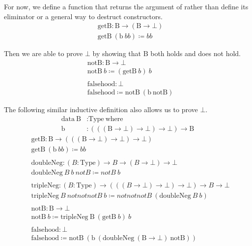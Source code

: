 \documentclass{report}
\newcommand{\const}[1]{\text{#1}}
\newcommand{\data}{\const{data}}
\newcommand{\Type}{\const{Type}}
\newcommand{\where}{\const{where}}
\begin{document}
For now, we define a function that returns the argument of \const{b} rather than define its eliminator or a general way to destruct constructors.
%
\begin{align*}
    &\const{getB}: \const{B} \to (\const{B} \to \bot) \\
    &\const{getB} ~ (\const{b} ~ bb) \coloneqq bb
\end{align*}

Then we are able to prove $\bot$ by showing that $\const{B}$ both holds and does not hold.
%
\begin{align*}
    &\const{notB}: \const{B} \to \bot \\
    &\const{notB} ~ b \coloneqq (\const{getB} ~ b) ~ b \\
    \\
    &\const{falsehood}: \bot \\
    &\const{falsehood} \coloneqq \const{notB} ~ (\const{b} ~ \const{notB})
\end{align*}

The following similar inductive definition also allows us to prove $\bot$.
%
\begin{align*}
    \data ~ \const{B} &: \Type ~ \where \\
    \const{b} &: (((\const{B} \to \bot) \to \bot) \to \bot) \to \const{B}
\end{align*}
\begin{align*}
    &\const{getB}: \const{B} \to (((\const{B} \to \bot) \to \bot) \to \bot) \\
    &\const{getB} ~ (\const{b} ~ bb) \coloneqq bb \\
    \\
    &\const{doubleNeg}: (B: \Type) \to B \to (B \to \bot) \to \bot \\
    &\const{doubleNeg} ~ B ~ b ~ notB \coloneqq notB ~ b \\
    \\
    &\const{tripleNeg}: (B: \Type) \to (((B \to \bot) \to \bot) \to \bot) \to B \to \bot \\
    &\const{tripleNeg} ~ B ~ notnotnotB ~ b \coloneqq notnotnotB ~ (\const{doubleNeg} ~ B ~ b) \\
    \\
    &\const{notB}: \const{B} \to \bot \\
    &\const{notB} ~ b \coloneqq \const{tripleNeg} ~ \const{B} ~ (\const{getB} ~ b) ~ b \\
    \\
    &\const{falsehood}: \bot \\
    &\const{falsehood} \coloneqq \const{notB} ~ (\const{b} ~ (\const{doubleNeg} ~ (\const{B} \to \bot) ~ \const{notB})) \\
\end{align*}
\end{document}
